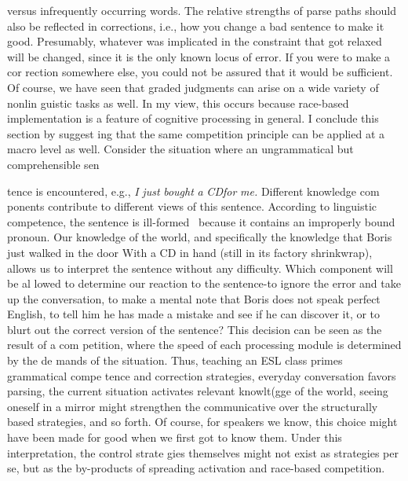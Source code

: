 \begin{styleStandard}
versus infrequently occurring words. The relative strengths of parse paths should also be reflected in corrections, i.e., how you change a bad sentence to make it good. Presumably, whatever was implicated in the constraint that got relaxed will be changed, since it is the only known locus of error. If you were to make a cor\- rection somewhere else, you could not be assured that it would be sufficient. Of course, we have seen that graded judgments can arise on a wide variety of nonlin\- guistic tasks as well. In my view, this occurs because race-based implementation is a feature of cognitive processing in general. I conclude this section by suggest\- ing that the same competition principle can be applied at a macro level as well. Consider the situation where an ungrammatical but comprehensible sen\-
\end{styleStandard}


\begin{styleStandard}
tence is encountered, e.g., \textit{I}\textit{ }\textit{just}\textit{ }\textit{bought}\textit{ }\textit{a}\textit{ }\textit{CD}\textit{for}\textit{ }\textit{me.}\textit{ }Different knowledge com\- ponents contribute to different views of this sentence. According to linguistic competence, the sentence is ill-formed \ because it contains an improperly bound pronoun. Our knowledge of the world, and specifically the knowledge that Boris just walked in the door With a CD in hand (still in its factory shrinkwrap), allows us to interpret the sentence without any difficulty. Which component will be al\- lowed to determine our reaction to the sentence-to ignore the error and take up the conversation, to make a mental note that Boris does not speak perfect English, to tell him he has made a mistake and see if he can discover it, or to blurt out the correct version of the sentence? This decision can be seen as the result of a com\- petition, where the {\textquotedbl}speed{\textquotedbl} of each processing module is determined by the de\- mands of the situation. Thus, teaching an ESL class primes grammatical compe\- tence and correction strategies, everyday conversation favors parsing, the current situation activates relevant knowlt(gge of the world, seeing oneself in a mirror might strengthen the communicative over the structurally based strategies, and so forth. Of course, for speakers we know, this choice might have been made for good when we first got to know them. Under this interpretation, the control strate\- gies themselves might not exist as strategies per se, but as the by-products of spreading activation and race-based competition.
\end{styleStandard}


